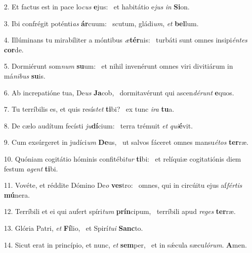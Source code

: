 2. Et factus est in pace lo\textit{cus} \textbf{e}jus: \ast\  et habitátio e\textit{jus} \textit{in} \textbf{Si}on.\

3. Ibi confrégit poténti\textit{as} \textbf{ár}cuum: \ast\  scutum, gládi\textit{um}, \textit{et} \textbf{bel}lum.\

4. Illúminans tu mirabíliter a móntibus \textit{æ}\textbf{tér}nis: \ast\  turbáti sunt omnes insipi\textit{én}\textit{tes} \textbf{cor}de.\

5. Dormiérunt som\textit{num} \textbf{su}um: \ast\  et nihil invenérunt omnes viri divitiárum in má\textit{ni}\textit{bus} \textbf{su}is.\

6. Ab increpatióne tua, De\textit{us} \textbf{Ja}cob, \ast\  dormitavérunt qui ascen\textit{dé}\textit{runt} \textbf{e}quos.\

7. Tu terríbilis es, et quis resís\textit{tet} \textbf{ti}bi? \ast\  ex tunc \textit{i}\textit{ra} \textbf{tu}a.\

8. De cælo audítum fecísti \textit{ju}\textbf{dí}cium: \ast\  terra trémuit \textit{et} \textit{qui}\textbf{é}vit.\

9. Cum exsúrgeret in judíci\textit{um} \textbf{De}us, \ast\  ut salvos fáceret omnes mansu\textit{é}\textit{tos} \textbf{ter}ræ.\

10. Quóniam cogitátio hóminis confitébi\textit{tur} \textbf{ti}bi: \ast\  et relíquiæ cogitatiónis diem festum \textit{a}\textit{gent} \textbf{ti}bi.\

11. Vovéte, et réddite Dómino De\textit{o} \textbf{ves}tro: \ast\  omnes, qui in circúitu ejus af\textit{fér}\textit{tis} \textbf{mú}nera.\

12. Terríbili et ei qui aufert spíri\textit{tum} \textbf{prín}cipum, \ast\  terríbili apud \textit{re}\textit{ges} \textbf{ter}ræ.\

13. Glória Patri, \textit{et} \textbf{Fí}lio, \ast\  et Spirí\textit{tu}\textit{i} \textbf{Sanc}to.\

14. Sicut erat in princípio, et nunc, \textit{et} \textbf{sem}per, \ast\  et in sǽcula sæcu\textit{ló}\textit{rum}. \textbf{A}men.\

